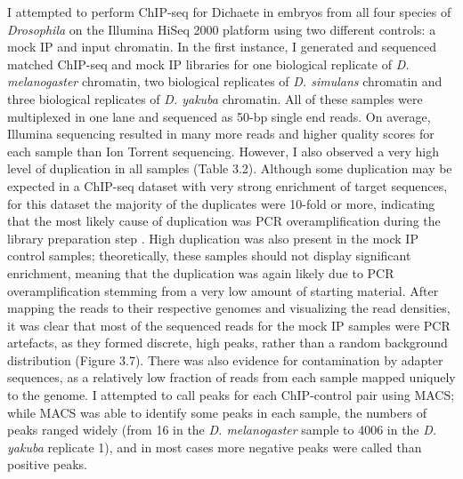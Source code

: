 I attempted to perform ChIP-seq for Dichaete in embryos from all four species of \emph{Drosophila} on the Illumina HiSeq 2000 platform using two different controls: a mock IP and input chromatin. In the first instance, I generated and sequenced matched ChIP-seq and mock IP libraries for one biological replicate of \emph{D. melanogaster} chromatin, two biological replicates of \emph{D. simulans} chromatin and three biological replicates of \emph{D. yakuba} chromatin. All of these samples were multiplexed in one lane and sequenced as 50-bp single end reads. On average, Illumina sequencing resulted in many more reads and higher quality scores for each sample than Ion Torrent sequencing. However, I also observed a very high level of duplication in all samples (Table 3.2). Although some duplication may be expected in a ChIP-seq dataset with very strong enrichment of target sequences, for this dataset the majority of the duplicates were 10-fold or more, indicating that the most likely cause of duplication was PCR overamplification during the library preparation step \citep{bardet_computational_2011}. High duplication was also present in the mock IP control samples; theoretically, these samples should not display significant enrichment, meaning that the duplication was again likely due to PCR overamplification stemming from a very low amount of starting material. After mapping the reads to their respective genomes and visualizing the read densities, it was clear that most of the sequenced reads for the mock IP samples were PCR artefacts, as they formed discrete, high peaks, rather than a random background distribution (Figure 3.7). There was also evidence for contamination by adapter sequences, as a relatively low fraction of reads from each sample mapped uniquely to the genome. I attempted to call peaks for each ChIP-control pair using MACS; while MACS was able to identify some peaks in each sample, the numbers of peaks ranged widely (from 16 in the \emph{D. melanogaster} sample to 4006 in the \emph{D. yakuba} replicate 1), and in most cases more negative peaks were called than positive peaks.


